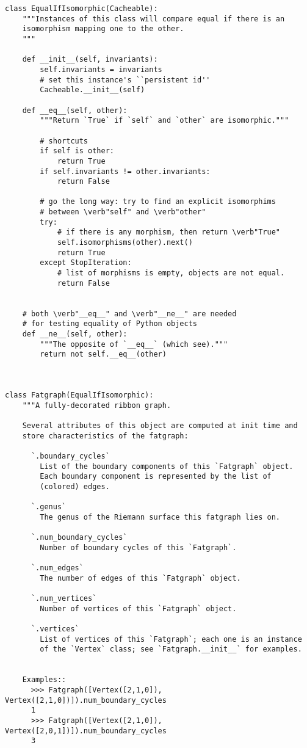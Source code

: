 \begin{lstlisting}
class EqualIfIsomorphic(Cacheable):
    """Instances of this class will compare equal if there is an
    isomorphism mapping one to the other.
    """

    def __init__(self, invariants):
        self.invariants = invariants
        # set this instance's ``persistent id''
        Cacheable.__init__(self)

    def __eq__(self, other):
        """Return `True` if `self` and `other` are isomorphic."""

        # shortcuts
        if self is other:
            return True
        if self.invariants != other.invariants:
            return False

        # go the long way: try to find an explicit isomorphims
        # between \verb"self" and \verb"other"
        try:
            # if there is any morphism, then return \verb"True"
            self.isomorphisms(other).next()
            return True
        except StopIteration:
            # list of morphisms is empty, objects are not equal.
            return False


    # both \verb"__eq__" and \verb"__ne__" are needed 
    # for testing equality of Python objects
    def __ne__(self, other):
        """The opposite of `__eq__` (which see)."""
        return not self.__eq__(other)



class Fatgraph(EqualIfIsomorphic):
    """A fully-decorated ribbon graph.

    Several attributes of this object are computed at init time and
    store characteristics of the fatgraph:

      `.boundary_cycles`
        List of the boundary components of this `Fatgraph` object.
        Each boundary component is represented by the list of
        (colored) edges.

      `.genus`
        The genus of the Riemann surface this fatgraph lies on.
      
      `.num_boundary_cycles`
        Number of boundary cycles of this `Fatgraph`.

      `.num_edges`
        The number of edges of this `Fatgraph` object.

      `.num_vertices`
        Number of vertices of this `Fatgraph` object.

      `.vertices`
        List of vertices of this `Fatgraph`; each one is an instance
        of the `Vertex` class; see `Fatgraph.__init__` for examples.

        
    Examples::
      >>> Fatgraph([Vertex([2,1,0]), Vertex([2,1,0])]).num_boundary_cycles
      1
      >>> Fatgraph([Vertex([2,1,0]), Vertex([2,0,1])]).num_boundary_cycles
      3


\end{lstlisting}
